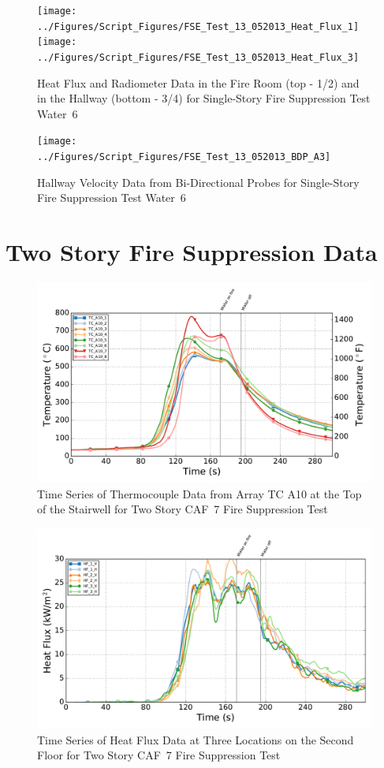 \documentclass[12pt,oneside]{book}
\begin{document}
\begin{figure}[ht]
\texttt{[image: ../Figures/Script\_Figures/FSE\_Test\_13\_052013\_Heat\_Flux\_1]}
\texttt{[image: ../Figures/Script\_Figures/FSE\_Test\_13\_052013\_Heat\_Flux\_3]}
\caption{Heat Flux and Radiometer Data in the Fire Room (top - 1/2) and in the Hallway (bottom - 3/4) for Single-Story Fire Suppression Test Water~6}
\end{figure}

\begin{figure}[ht]
\texttt{[image: ../Figures/Script\_Figures/FSE\_Test\_13\_052013\_BDP\_A3]}
\caption{Hallway Velocity Data from Bi-Directional Probes for Single-Story Fire Suppression Test Water~6}
\end{figure}

\chapter{Two Story Fire Suppression Data}
\label{app:fire_suppression2}

\begin{figure}[!ht]
	\includegraphics[width=.85\columnwidth]{../Figures/Script_Figures/Test_38_West_061315_TC_A10}
	\caption{Time Series of Thermocouple Data from Array TC A10 at the Top of the Stairwell for Two Story CAF~7 Fire Suppression Test}
	\label{fig:app_caf7_tca10}
\end{figure}

\begin{figure}[!ht]
	\includegraphics[width=.85\columnwidth]{../Figures/Script_Figures/Test_38_West_061315_Heat_Flux}
	\caption{Time Series of Heat Flux Data at Three Locations on the Second Floor for Two Story CAF~7 Fire Suppression Test}
	\label{fig:app_caf7_hf}
\end{figure}
\end{document}
